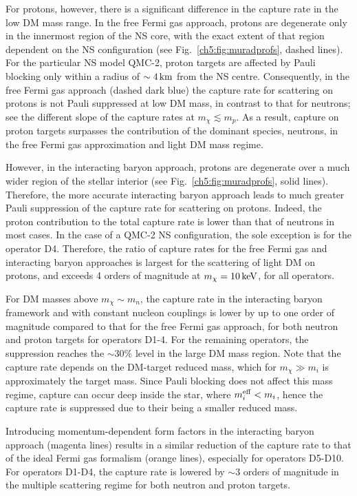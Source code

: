 For protons, however, there is a significant difference in the capture rate in the low DM mass range. In the free Fermi gas approach, protons are degenerate only in the innermost region of the NS core, with the exact extent of that region dependent on the NS configuration (see Fig.~\ref{ch5:fig:muradprofs}, dashed lines).  For the particular NS model QMC-2, proton targets are affected by Pauli blocking only within a radius of $\sim4{\rm \,km}$ from the NS centre. Consequently, in the free Fermi gas approach (dashed dark blue) the capture rate for scattering on protons is not Pauli suppressed at low DM mass, in contrast to that for neutrons; see the different slope of the capture rates at $m_\chi\lesssim m_p$.
As a result, capture on proton targets surpasses the contribution of the dominant species, neutrons, in the free Fermi gas approximation and light DM mass regime. 

However, in the interacting baryon approach, protons are degenerate over a much wider region of the stellar interior (see Fig.~\ref{ch5:fig:muradprofs}, solid lines). Therefore, the more accurate interacting baryon approach leads to much greater Pauli suppression of the capture rate for scattering on protons. Indeed, the proton contribution to the total capture rate is lower than that of neutrons in most cases. In the case of a QMC-2 NS configuration, the sole exception is for the operator D4. Therefore,  the ratio of capture rates for the free Fermi gas and interacting baryon approaches is largest for the scattering of light DM on protons, and exceeds 4 orders of magnitude at $m_\chi=10{\rm \,keV}$, for all operators. 


For DM masses above $m_\chi\sim m_n$, the capture rate in the interacting baryon framework and with constant nucleon couplings is lower by up to one order of magnitude compared to that for the free Fermi gas approach, for both neutron and proton targets for operators D1-4.
For the remaining operators, the suppression reaches the $\sim30\%$ level in the large DM mass region. 
Note that the capture rate depends on the DM-target reduced mass, which for $m_\chi\gg m_i$ is approximately the target mass. Since Pauli blocking does not affect this mass regime, capture can occur deep inside the star, where $m_i^{\rm eff}<m_i$, hence the capture rate is suppressed due to their being a smaller reduced mass.

Introducing momentum-dependent form factors in the interacting baryon approach (magenta lines) results in a similar reduction of the capture rate to that of the ideal Fermi gas formalism (orange lines), especially for operators D5-D10. For operators D1-D4, the capture rate is lowered by $\sim3$ orders of magnitude in the multiple scattering regime for both neutron and proton targets. 


